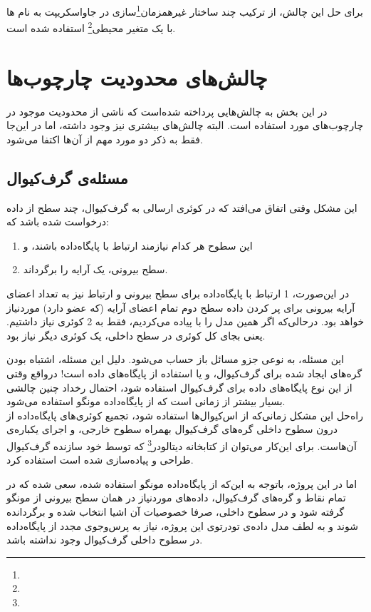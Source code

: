 برای حل این چالش، از ترکیب چند ساختار غیرهمزمان‌\footnote{}سازی در جاواسکریپت به نام ها با یک متغیر محیطی\footnote{} استفاده شده است.

\section{چالش‌های محدودیت چارچوب‌ها}

در این بخش به چالش‌هایی پرداخته شده‌است که ناشی از محدودیت موجود در چارچوب‌های مورد استفاده است. البته چالش‌های بیشتری نیز وجود داشته، ‌اما در این‌جا فقط به ذکر دو مورد مهم از آن‌ها اکتفا می‌شود.

\newpage

\subsection{مسئله‌ی  گرف‌کیوال}

این مشکل وقتی اتفاق می‌افتد که در کوئری ارسالی به گرف‌کیوال، چند سطح از  داده درخواست شده باشد که\cite{gql:nplusone}:
\begin{enumerate}
	\item این سطوح هر کدام نیازمند ارتباط با پایگاه‌داده باشند، و
	\item سطح بیرونی، یک آرایه را برگرداند.
\end{enumerate}

در این‌صورت، 1 ارتباط با پایگاه‌داده برای سطح بیرونی و  ارتباط نیز به تعداد اعضای آرایه بیرونی برای پر کردن داده سطح دوم تمام اعضای آرایه (که  عضو دارد) موردنیاز خواهد بود. درحالی‌که اگر همین مدل را با  پیاده می‌کردیم، فقط به 2 کوئری نیاز داشتیم. یعنی بجای کل  کوئری در سطح داخلی، یک کوئری دیگر نیاز بود\cite{gql:nplusone}.

این مسئله، به نوعی جزو مسائل باز حساب می‌شود. دلیل این مسئله، اشتباه بودن گره‌های ایجاد شده برای گرف‌کیوال، و یا استفاده از پایگاه‌های داده  است! درواقع وقتی از این نوع پایگاه‌های داده برای گرف‌کیوال استفاده شود، احتمال رخداد چنین چالشی بسیار بیشتر از زمانی است که از پایگاه‌داده مونگو استفاده می‌شود.\\

راه‌حل این مشکل زمانی‌که از اس‌کیوال‌ها استفاده شود، تجمیع کوئری‌های پایگاه‌داده از درون سطوح داخلی گره‌های گرف‌کیوال بهمراه سطوح خارجی، و اجرای یکباره‌ی آن‌هاست. برای این‌کار می‌توان از کتابخانه دیتالودر\footnote{} که توسط خود سازنده گرف‌کیوال طراحی و پیاده‌سازی شده است استفاده کرد.

اما در این پروژه، باتوجه به این‌که از پایگاه‌داده مونگو استفاده شده، سعی شده که در تمام نقاط و گره‌های گرف‌کیوال، داده‌های موردنیاز در همان سطح بیرونی از مونگو گرفته شود و در سطوح داخلی، صرفا خصوصیات آن اشیا انتخاب شده و برگردانده شوند و به لطف مدل داده‌ی تودرتوی این پروژه، نیاز به پرس‌وجوی مجدد از پایگاه‌داده در سطوح داخلی گرف‌کیوال وجود نداشته باشد.

